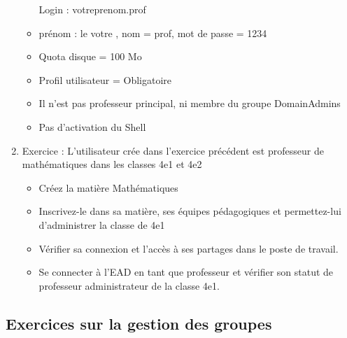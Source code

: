 \documentclass{article}
\begin{document}
\begin{enumerate}[(1)]
\begin{itemize}
    Login : votreprenom.prof
  \item
    prénom : le votre , nom = prof, mot de passe = 1234
  \item
    Quota disque = 100 Mo
  \item
    Profil utilisateur = Obligatoire
  \item
    Il n'est pas professeur principal, ni membre du groupe DomainAdmins
  \item
    Pas d'activation du Shell
  \end{itemize}
\item
  Exercice : L'utilisateur crée dans l'exercice précédent est professeur
  de mathématiques dans les classes 4e1 et 4e2
  \begin{itemize}
  \item
    Créez la matière Mathématiques
  \item
    Inscrivez-le dans sa matière, ses équipes pédagogiques et
    permettez-lui d'administrer la classe de 4e1
  \item
    Vérifier sa connexion et l'accès à ses partages dans le poste de
    travail.
  \item
    Se connecter à l'EAD en tant que professeur et vérifier son statut
    de professeur administrateur de la classe 4e1.
  \end{itemize}
\end{enumerate}
\subsection{Exercices sur la gestion des groupes}
\end{document}
